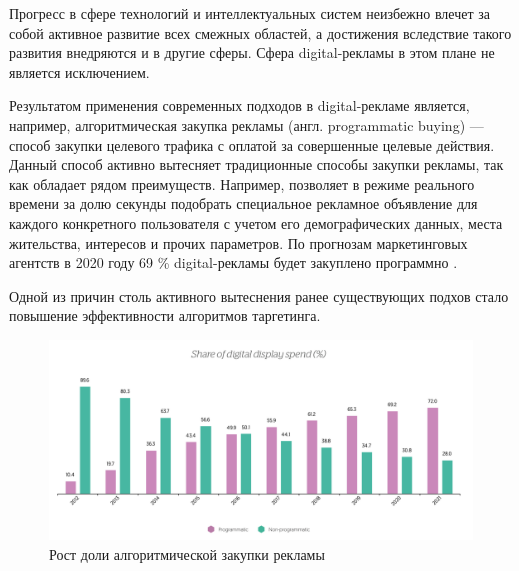 \documentclass[specification,annotation,times]{itmo-student-thesis}
\begin{document}



\tableofcontents






\startprefacepage

Прогресс в сфере технологий и интеллектуальных систем неизбежно влечет за собой активное развитие всех смежных областей, а достижения вследствие такого развития внедряются и в другие сферы. Сфера digital-рекламы в этом плане не является исключением. 

Результатом применения современных подходов в digital-рекламе является, например, алгоритмическая закупка рекламы (англ. programmatic buying) \cite{programmatic-buying} — способ закупки целевого трафика с оплатой за совершенные целевые действия. Данный способ активно вытесняет традиционные способы закупки рекламы, так как обладает рядом преимуществ. Например, позволяет в режиме реального времени за долю секунды подобрать специальное рекламное объявление для каждого конкретного пользователя с учетом его демографических данных, места жительства, интересов и прочих параметров. По прогнозам маркетинговых агентств в 2020 году 69 \% digital-рекламы будет закуплено программно \cite{growth-of-programmatic}. 

Одной из причин столь активного вытеснения ранее существующих подхов стало повышение эффективности алгоритмов таргетинга. 

\begin{figure}[!h]
\caption{Рост доли алгоритмической закупки рекламы}\label{fig:share-of-programmatic}
\includegraphics[width=\textwidth]{share-of-programmatic}
\centering
\end{figure}
\end{document}
